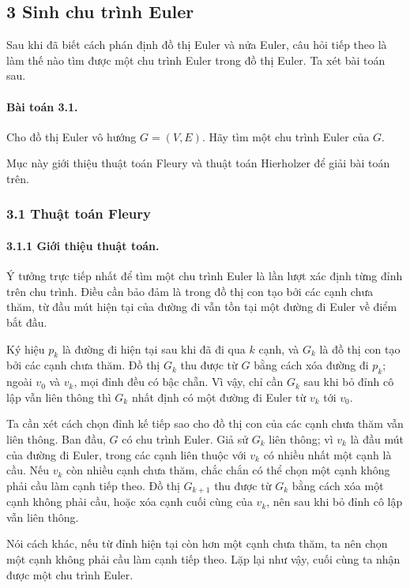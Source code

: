 \documentclass[11pt]{article}
\begin{document}
\subsection*{3 Sinh chu trình Euler}

Sau khi đã biết cách phán định đồ thị Euler và nửa Euler, câu hỏi tiếp theo là
làm thế nào tìm được một chu trình Euler trong đồ thị Euler. Ta xét bài toán
sau.

\paragraph{Bài toán 3.1.}
Cho đồ thị Euler vô hướng \(G=(V,E)\). Hãy tìm một chu trình Euler của \(G\).

Mục này giới thiệu thuật toán Fleury và thuật toán Hierholzer để giải bài toán
trên.

\subsubsection*{3.1 Thuật toán Fleury}

\paragraph{3.1.1 Giới thiệu thuật toán.}
Ý tưởng trực tiếp nhất để tìm một chu trình Euler là lần lượt xác định từng
đỉnh trên chu trình. Điều cần bảo đảm là trong đồ thị con tạo bởi các cạnh chưa
thăm, từ đầu mút hiện tại của đường đi vẫn tồn tại một đường đi Euler về điểm
bắt đầu.

Ký hiệu \(p_k\) là đường đi hiện tại sau khi đã đi qua \(k\) cạnh, và \(G_k\) là
đồ thị con tạo bởi các cạnh chưa thăm. Đồ thị \(G_k\) thu được từ \(G\) bằng
cách xóa đường đi \(p_k\); ngoài \(v_0\) và \(v_k\), mọi đỉnh đều có bậc chẵn.
Vì vậy, chỉ cần \(G_k\) sau khi bỏ đỉnh cô lập vẫn liên thông thì \(G_k\) nhất
định có một đường đi Euler từ \(v_k\) tới \(v_0\).

Ta cần xét cách chọn đỉnh kế tiếp sao cho đồ thị con của các cạnh chưa thăm vẫn
liên thông. Ban đầu, \(G\) có chu trình Euler. Giả sử \(G_k\) liên thông; vì
\(v_k\) là đầu mút của đường đi Euler, trong các cạnh liên thuộc với \(v_k\) có
nhiều nhất một cạnh là cầu. Nếu \(v_k\) còn nhiều cạnh chưa thăm, chắc chắn có
thể chọn một cạnh không phải cầu làm cạnh tiếp theo. Đồ thị \(G_{k+1}\) thu
được từ \(G_k\) bằng cách xóa một cạnh không phải cầu, hoặc xóa cạnh cuối cùng
của \(v_k\), nên sau khi bỏ đỉnh cô lập vẫn liên thông.

Nói cách khác, nếu từ đỉnh hiện tại còn hơn một cạnh chưa thăm, ta nên chọn một
cạnh không phải cầu làm cạnh tiếp theo. Lặp lại như vậy, cuối cùng ta nhận được
một chu trình Euler.
\end{document}
